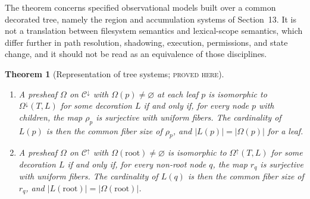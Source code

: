 \documentclass[11pt]{article}
\newtheorem{theorem}{Theorem}[section]
\theoremstyle{definition}
\theoremstyle{remark}
\newcommand{\stN}{\textsc{proved here}}
\newcommand{\cC}{\mathcal C}
\begin{document}
The theorem concerns specified observational models built over a common decorated tree, namely the region and accumulation systems of Section~13. It is not a translation between filesystem semantics and lexical-scope semantics, which differ further in path resolution, shadowing, execution, permissions, and state change, and it should not be read as an equivalence of those disciplines.

\begin{theorem}[Representation of tree systems; \stN]\label{thm:treerep}
\begin{enumerate}[label=(\alph*)]
\item A presheaf $\Omega$ on $\cC^{\downarrow}$ with $\Omega(p)\neq\varnothing$ at each leaf $p$ is isomorphic to $\Omega^{\downarrow}(T,L)$ for some decoration $L$ if and only if, for every node $p$ with children, the map $\rho_p$ is surjective with uniform fibers. The cardinality of $L(p)$ is then the common fiber size of $\rho_p$, and $|L(p)|=|\Omega(p)|$ for a leaf.
\item A presheaf $\Omega$ on $\cC^{\uparrow}$ with $\Omega(\mathrm{root})\neq\varnothing$ is isomorphic to $\Omega^{\uparrow}(T,L)$ for some decoration $L$ if and only if, for every non-root node $q$, the map $r_q$ is surjective with uniform fibers. The cardinality of $L(q)$ is then the common fiber size of $r_q$, and $|L(\mathrm{root})|=|\Omega(\mathrm{root})|$.
\end{enumerate}
\end{theorem}
\end{document}
